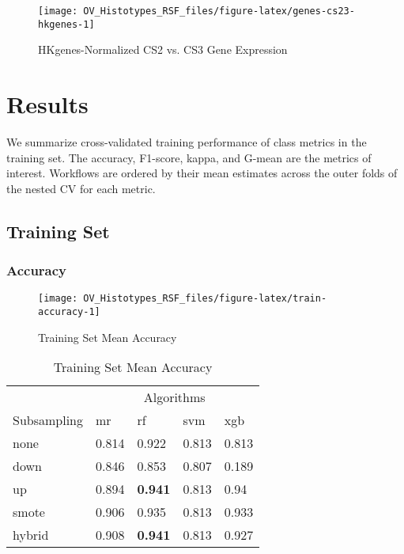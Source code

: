 \documentclass[
]{report}
\begin{document}
\begin{figure}[H]

{\centering \texttt{[image: OV\_Histotypes\_RSF\_files/figure-latex/genes-cs23-hkgenes-1]} 

}

\caption{HKgenes-Normalized CS2 vs. CS3 Gene Expression}\label{fig:genes-cs23-hkgenes}
\end{figure}

\hypertarget{results}{%
\chapter{Results}\label{results}}

We summarize cross-validated training performance of class metrics in the training set. The accuracy, F1-score, kappa, and G-mean are the metrics of interest. Workflows are ordered by their mean estimates across the outer folds of the nested CV for each metric.

\hypertarget{training-set}{%
\section{Training Set}\label{training-set}}

\hypertarget{accuracy}{%
\subsection{Accuracy}\label{accuracy}}

\begin{figure}[H]

{\centering \texttt{[image: OV\_Histotypes\_RSF\_files/figure-latex/train-accuracy-1]} 

}

\caption{Training Set Mean Accuracy}\label{fig:train-accuracy}
\end{figure}

\begin{table}

\caption{\label{tab:train-accuracy-table}Training Set Mean Accuracy}
\centering
\begin{tabular}[t]{l|l|l|l|l}
\hline
\multicolumn{1}{c|}{ } & \multicolumn{4}{c}{Algorithms} \\
\cline{2-5}
Subsampling & mr & rf & svm & xgb\\
\hline
none & 0.814 & 0.922 & 0.813 & 0.813\\
\hline
down & 0.846 & 0.853 & 0.807 & 0.189\\
\hline
up & 0.894 & \textbf{0.941} & 0.813 & 0.94\\
\hline
smote & 0.906 & 0.935 & 0.813 & 0.933\\
\hline
hybrid & 0.908 & \textbf{0.941} & 0.813 & 0.927\\
\hline
\end{tabular}
\end{table}
\end{document}
